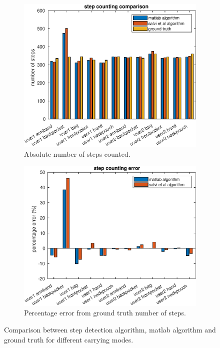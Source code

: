 \begin{figure}[H]
	\centering
	\begin{subfigure}[t]{.5\textwidth}
		\centering
		\includegraphics[width=\linewidth]{images/20200930_1214_step_counting_comparison}
		\caption{Absolute number of steps counted.}
		\label{fig:sd_abs_comparison}
	\end{subfigure}%
	\begin{subfigure}[t]{0.5\textwidth}
		\centering
		\includegraphics[width=\linewidth]{images/20200928_1248_step_counting_error}
		\caption{Percentage error from ground truth number of steps. }
		\label{fig:sd_percent_comparison}
	\end{subfigure}
	\caption[Step detection comparison]{Comparison between \citet{Salvi2018} step detection algorithm, matlab algorithm and ground truth for different carrying modes.}
	\label{fig:sd_comparison}
\end{figure}


